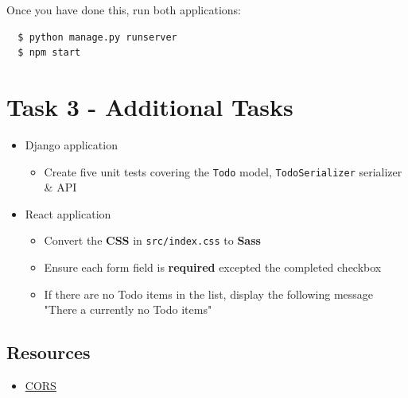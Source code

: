 \documentclass{article}
\begin{document}
Once you have done this, run both applications:

\begin{verbatim}
  $ python manage.py runserver
  $ npm start
\end{verbatim}

\section*{Task 3 - Additional Tasks} 
\begin{itemize}
  \item Django application
  \begin{itemize}
    \item Create five unit tests covering the \texttt{Todo} model, \texttt{TodoSerializer} serializer \& API
  \end{itemize}
  \item React application
  \begin{itemize}
    \item Convert the \textbf{CSS} in \texttt{src/index.css} to \textbf{Sass}
    \item Ensure each form field is \textbf{required} excepted the completed checkbox
    \item If there are no Todo items in the list, display the following message "There a currently no Todo items"
  \end{itemize}
\end{itemize} 


\subsection*{Resources} 
\begin{itemize}
  \item \href{https://developer.mozilla.org/en-US/docs/Web/HTTP/CORS}{CORS}
\end{itemize}
 
\end{document}
